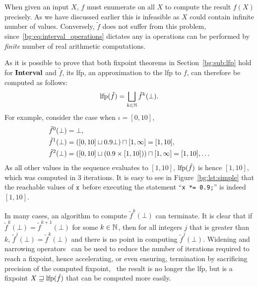 When given an input $X$, $f$ must enumerate on all $X$ to compute the result
$f(X)$ precisely.  As we have discussed earlier this is infeasible as $X$
could contain infinite number of values.  Conversely, $\tilde{f}$ does not
suffer from this problem, since~\eqref{bg:eq:interval_operations} dictates any
\gls{ia} operations can be performed by \emph{finite} number of real arithmetic
computations.

As it is possible to prove that both fixpoint theorems in
Section~\ref{bg:sub:lfp} hold for $\mathbf{Interval}$ and $\tilde{f}$, its
\gls{lfp}, an approximation to the \gls{lfp} to $f$, can therefore be computed
as follows:
\begin{equation}
    \operatorname{\mathrm{lfp}} (\tilde{f}) = \bigsqcup_{k \in \mathbb{N}} \tilde{f}^k (\bot).
\end{equation}
For example, consider the case when $\iota = [0, 10]$,
\begin{equation}
    \begin{aligned}
        \tilde{f}^0 (\bot) &= \bot, \\
        \tilde{f}^1 (\bot) &= \left(
                [0, 10] \sqcup 0.9 \bot
            \right) \sqcap [1, \infty] = [1, 10], \\
        \tilde{f}^2 (\bot) &= \left(
                [0, 10] \sqcup \left( 0.9 \times [1, 10] \right)
            \right) \sqcap [1, \infty] = [1, 10], \mathellipsis
    \end{aligned}
\end{equation}
As all other values in the sequence evaluates to $[1, 10]$, $\operatorname{\mathrm{lfp}}(\tilde{f})$
is hence $[1, 10]$, which was computed in 3 iterations.  It is easy to see
in Figure~\ref{bg:lst:simple} that the reachable values of $\texttt{x}$ before
executing the statement ``\verb|x *= 0.9;|'' is indeed $[1, 10]$.

In many cases, an algorithm to compute $\tilde{f}^k(\bot)$ can terminate.
It is clear that if $\tilde{f}^k(\bot) = \tilde{f}^{k+1}(\bot)$ for some
$k \in \mathbb{N}$, then for all integers $j$ that is greater than $k$,
$\tilde{f}^{j}(\bot) = \tilde{f}^{k}(\bot)$ and there is no point in computing
$\tilde{f}^{j}(\bot)$.  Widening and narrowing operators~\cite{cousot77,
nielson99} can be used to reduce the number of iterations required to reach
a fixpoint, hence accelerating, or even ensuring, termination by sacrificing
precision of the computed fixpoint, \ie~the result is no longer the \gls{lfp},
but is a fixpoint $X \sqsupseteq \operatorname{\mathrm{lfp}}(\tilde{f})$ that can be computed more
easily.

